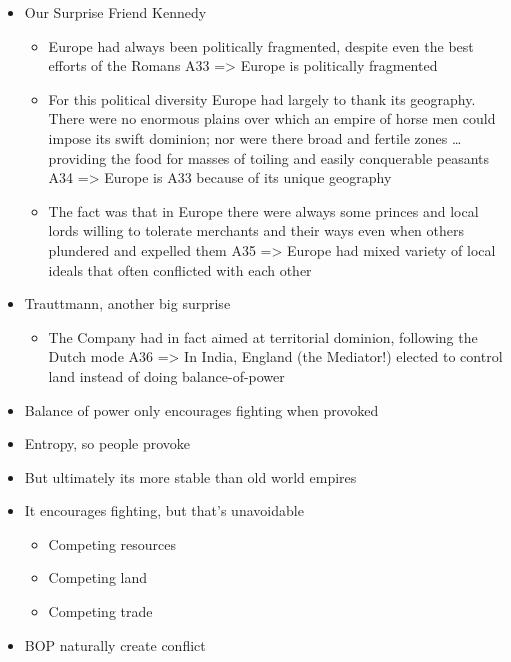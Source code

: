 \documentclass[letterpaper]{article}
\begin{document}
\begin{itemize}
\item Our Surprise Friend Kennedy

\begin{itemize}
\item Europe had always been politically fragmented, despite even the best
efforts of the Romans A33 => Europe is politically fragmented
\item For this political diversity Europe had largely to thank its
geography. There were no enormous plains over which an empire of
horse men could impose its swift dominion; nor were there broad and
fertile zones \ldots{} providing the food for masses of toiling and
easily conquerable peasants A34 => Europe is A33 because of its
unique geography
\item The fact was that in Europe there were always some princes and local
lords willing to tolerate merchants and their ways even when others
plundered and expelled them A35 => Europe had mixed variety of local
ideals that often conflicted with each other
\end{itemize}

\item Trauttmann, another big surprise

\begin{itemize}
\item The Company had in fact aimed at territorial dominion, following the
Dutch mode A36 => In India, England (the Mediator!) elected to
control land instead of doing balance-of-power
\end{itemize}

\item Balance of power only encourages fighting when provoked

\item Entropy, so people provoke

\item But ultimately its more stable than old world empires

\item It encourages fighting, but that's unavoidable

\begin{itemize}
\item Competing resources
\item Competing land
\item Competing trade
\end{itemize}

\item BOP naturally create conflict


\end{itemize}
\end{document}

